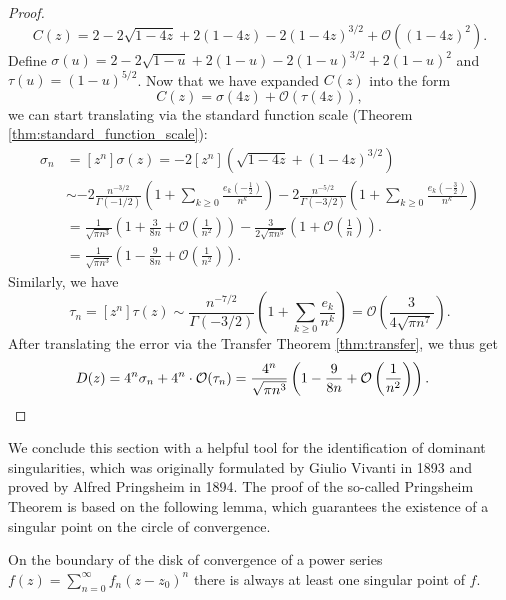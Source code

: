 \begin{proof}
$$    C(z) = 2 - 2\sqrt{1-4z} + 2(1-4z) - 2(1-4z)^{3/2} + \mathcal{O}((1-4z)^{2}).
  $$
  Define $\sigma(u) = 2 - 2\sqrt{1 - u} + 2(1-u) -2(1-u)^{3/2} + 2(1-u)^{2}$  and $\tau(u) = (1-u)^{5/2}$. Now that we have expanded $C(z)$ into the form 
  $$
  C(z) = \sigma(4z) + \mathcal{O}(\tau(4z)),
  $$
  we can start translating via the standard function scale (Theorem \ref{thm:standard_function_scale}): 
  \begin{align*}
    \sigma_{n} &= [z^{n}]\sigma(z) = -2[z^{n}]\left(\sqrt{1 -4z} + (1-4z)^{3/2}\right) \\
    &\sim -2\frac{n^{-3/2}}{\Gamma(-1/2)}\left(1 + \sum_{k \geq 0} \frac{e_{k}\left(-\frac{1}{2}\right)}{n^k}\right) -2\frac{n^{-5/2}}{\Gamma(-3/2)}\left(1 + \sum_{k \geq 0} \frac{e_{k}\left(- \frac{3}{2}\right)}{n^k}\right)\\
    &= \frac{1}{\sqrt{\pi n^{3}}} \left(1 + \frac{3}{8n} + \mathcal{O}\left(\frac{1}{n^{2}}\right)\right) - \frac{3}{2\sqrt{\pi n^{5}}}\left(1 + \mathcal{O}\left(\frac{1}{n}\right)\right).\\
    &= \frac{1}{\sqrt{\pi n^{3}}} \left(1 - \frac{9}{8n} + \mathcal{O}\left(\frac{1}{n^{2}}\right)\right).
  \end{align*}
  Similarly, we have
  $$
    \tau_n = [z^n] \tau(z) \sim \frac{n^{-7/2}}{\Gamma(-3/2)}\left(1 + \sum_{k \geq 0} \frac{e_k}{n^k}\right)
    = \mathcal{O}\left(\frac{3}{4\sqrt{\pi n^{7}}}\right).
  $$
  After translating the error via the Transfer Theorem \ref{thm:transfer}, we thus get
  \begin{align*}
    [z^n]D(z) &= 4^n\sigma_n + 4^n \cdot \mathcal{O}(\tau_n)
    = \frac{4^{n}}{\sqrt{\pi n^{3}}}\left(1 - \frac{9}{8n} + \mathcal{O}\left(\frac{1}{n^{2}}\right)\right). \qedhere
  \end{align*}
\end{proof}

We conclude this section with a helpful tool for the identification of dominant singularities, which was originally formulated by Giulio Vivanti in 1893 and proved by Alfred Pringsheim in 1894. The proof of the so-called Pringsheim Theorem is based on the following lemma, which guarantees the existence of a singular point on the circle of convergence.

\begin{lemma}
\label{lemma:singular_points}
  On the boundary of the disk of convergence of a power series $f(z) = \sum_{n=0}^\infty f_n(z-z_0)^n$ there is always at least one singular point of $f$.
\end{lemma}

